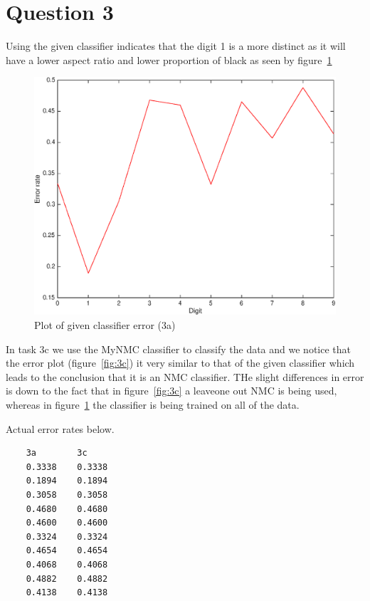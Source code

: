 \documentclass{article}
\begin{document}
\section*{Question 3}


Using the given classifier indicates that the digit 1 is a more distinct as it will have a lower aspect ratio and lower proportion of black as seen by figure~\ref{fig:3a}
\begin{figure}
\centering
\includegraphics[width=\textwidth]{3a}
\caption{Plot of given classifier error (3a)}
\label{fig:3a}
\end{figure}

In task 3c we use the MyNMC classifier to classify the data and we notice that the error plot (figure~\ref{fig:3c}) it very similar to that of the given classifier which leads to the conclusion that it is an NMC classifier. THe slight differences in error is down to the fact that in figure~\ref{fig:3c} a leaveone out NMC is being used, whereas in figure~\ref{fig:3a} the classifier is being trained on all of the data.

Actual error rates below.

\begin{lstlisting}
    3a        3c
    0.3338    0.3338
    0.1894    0.1894
    0.3058    0.3058
    0.4680    0.4680
    0.4600    0.4600
    0.3324    0.3324
    0.4654    0.4654
    0.4068    0.4068
    0.4882    0.4882
    0.4138    0.4138
\end{lstlisting}
\end{document}
